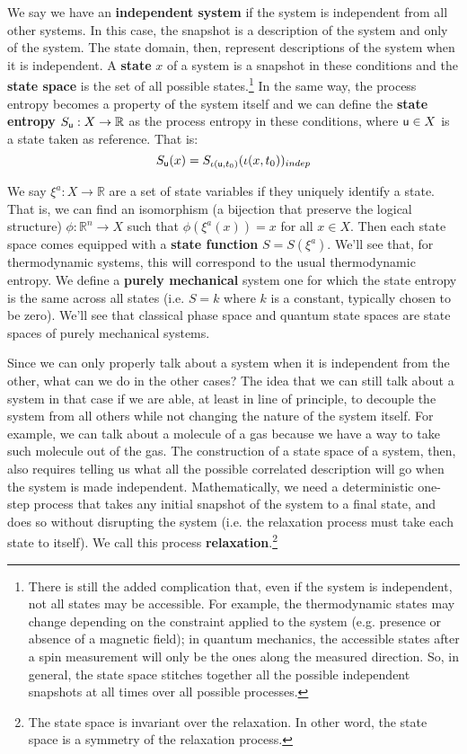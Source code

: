 \documentclass[letterpaper]{article}
\begin{document}
We say we have an \textbf{independent system} if the system is independent from all other systems. In this case, the snapshot is a description of the system and only of the system. The state domain, then, represent descriptions of the system when it is independent. A \textbf{state} $x$ of a system is a snapshot in these conditions and the \textbf{state space} is the set of all possible states.\footnote{There is still the added complication that, even if the system is independent, not all states may be accessible. For example, the thermodynamic states may change depending on the constraint applied to the system (e.g. presence or absence of a magnetic field); in quantum mechanics, the accessible states after a spin measurement will only be the ones along the measured direction. So, in general, the state space stitches together all the possible independent snapshots at all times over all possible processes.} In the same way, the process entropy becomes a property of the system itself and we can define the \textbf{state entropy} $S_{\stmt[u]} : X \to \mathbb{R}$ as the process entropy in these conditions, where $\stmt[u] \in X$ is a state taken as reference. That is:
\begin{equation}
	S_{\stmt[u]}(x) = S_{\iota(\stmt[u], t_0)}(\iota( x, t_0))_{indep}
\end{equation}

We say $\xi^a : X \to \mathbb{R}$ are a set of state variables if they uniquely identify a state. That is, we can find an isomorphism (a bijection that preserve the logical structure) $\phi : \mathbb{R}^n \to X$ such that $\phi(\xi^a(x)) = x$ for all $x \in X$. Then each state space comes equipped with a \textbf{state function} $S=S(\xi^a)$. We'll see that, for thermodynamic systems, this will correspond to the usual thermodynamic entropy. We define a \textbf{purely mechanical} system one for which the state entropy is the same across all states (i.e. $S=k$ where $k$ is a constant, typically chosen to be zero). We'll see that classical phase space and quantum state spaces are state spaces of purely mechanical systems.

Since we can only properly talk about a system when it is independent from the other, what can we do in the other cases? The idea that we can still talk about a system in that case if we are able, at least in line of principle, to decouple the system from all others while not changing the nature of the system itself. For example, we can talk about a molecule of a gas because we have a way to take such molecule out of the gas. The construction of a state space of a system, then, also requires telling us what all the possible correlated description will go when the system is made independent. Mathematically, we need a deterministic one-step process that takes any initial snapshot of the system to a final state, and does so without disrupting the system (i.e. the relaxation process must take each state to itself). We call this process \textbf{relaxation}.\footnote{The state space is invariant over the relaxation. In other word, the state space is a symmetry of the relaxation process.}
\end{document}

